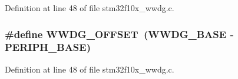 Definition at line 48 of file stm32f10x\+\_\+wwdg.\+c.

\subsubsection[{\texorpdfstring{W\+W\+D\+G\+\_\+\+O\+F\+F\+S\+ET}{WWDG_OFFSET}}]{\setlength{\rightskip}{0pt plus 5cm}\#define W\+W\+D\+G\+\_\+\+O\+F\+F\+S\+ET~({\bf W\+W\+D\+G\+\_\+\+B\+A\+SE} -\/ {\bf P\+E\+R\+I\+P\+H\+\_\+\+B\+A\+SE})}\hypertarget{group___w_w_d_g___private___defines_gab6dcdf2385dd7317ec775e146cff40ca}{}\label{group___w_w_d_g___private___defines_gab6dcdf2385dd7317ec775e146cff40ca}


Definition at line 48 of file stm32f10x\+\_\+wwdg.\+c.

